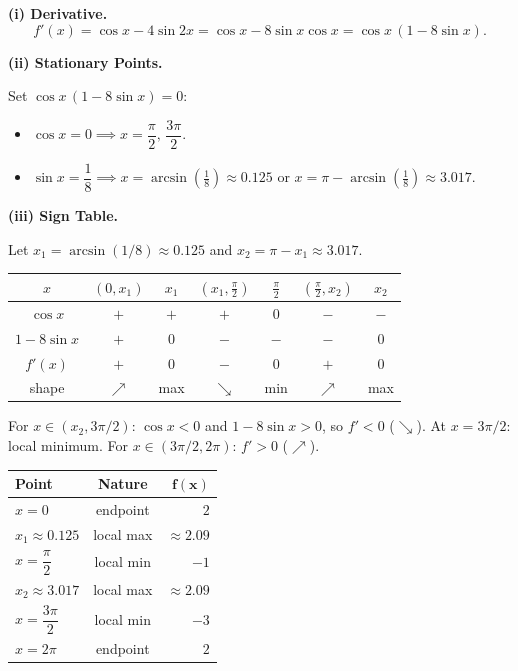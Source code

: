 \begin{solution}
\textbf{(i) Derivative.}
\[
f'(x) = \cos x - 4\sin 2x = \cos x - 8\sin x\cos x = \cos x\,(1 - 8\sin x).
\]

\textbf{(ii) Stationary Points.}

Set $\cos x\,(1 - 8\sin x) = 0$:
\begin{itemize}[leftmargin=*]
  \item $\cos x = 0 \implies x = \dfrac{\pi}{2},\, \dfrac{3\pi}{2}$.
  \item $\sin x = \dfrac{1}{8} \implies x = \arcsin\!\left(\tfrac{1}{8}\right) \approx 0.125$
        or $x = \pi - \arcsin\!\left(\tfrac{1}{8}\right) \approx 3.017$.
\end{itemize}

\textbf{(iii) Sign Table.}

Let $x_1 = \arcsin(1/8) \approx 0.125$ and $x_2 = \pi - x_1 \approx 3.017$.

\medskip
\noindent
\begin{center}
\renewcommand{\arraystretch}{1.3}
\begin{tabular}{c|cccccc}
$x$ & $(0,x_1)$ & $x_1$ & $(x_1,\frac{\pi}{2})$ & $\frac{\pi}{2}$ & $(\frac{\pi}{2},x_2)$ & $x_2$ \\
\hline
$\cos x$       & $+$ & $+$ & $+$ & $0$ & $-$ & $-$ \\
$1-8\sin x$    & $+$ & $0$ & $-$ & $-$ & $-$ & $0$ \\
$f'(x)$        & $+$ & $0$ & $-$ & $0$ & $+$ & $0$ \\
shape          & $\nearrow$ & max & $\searrow$ & min & $\nearrow$ & max \\
\end{tabular}
\end{center}

\medskip
For $x \in (x_2, 3\pi/2)$: $\cos x < 0$ and $1-8\sin x > 0$, so $f' < 0$ ($\searrow$).
At $x = 3\pi/2$: local minimum.  For $x \in (3\pi/2, 2\pi)$: $f' > 0$ ($\nearrow$).

\medskip
\begin{center}
\renewcommand{\arraystretch}{1.4}
\begin{tabular}{l c r}
\hline
\textbf{Point} & \textbf{Nature} & $\boldsymbol{f(x)}$ \\
\hline
$x = 0$ & endpoint & $2$ \\
$x_1 \approx 0.125$ & local max & $\approx 2.09$ \\
$x = \dfrac{\pi}{2}$ & local min & $-1$ \\
$x_2 \approx 3.017$ & local max & $\approx 2.09$ \\
$x = \dfrac{3\pi}{2}$ & local min & $-3$ \\
$x = 2\pi$ & endpoint & $2$ \\
\hline
\end{tabular}
\end{center}


\end{solution}
